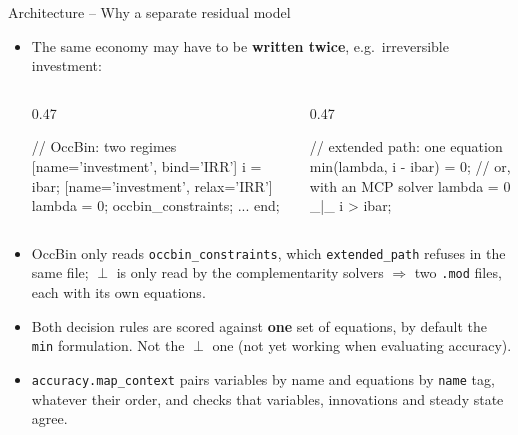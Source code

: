 \documentclass[11pt,aspectratio=169]{beamer}
\newcommand{\code}[1]{\texttt{#1}}
\begin{document}
\begin{frame}[fragile]{Architecture -- Why a separate residual model}

\begin{itemize}

\item The same economy may have to be \textbf{written twice}, e.g.\ irreversible investment:
\begin{columns}[T]
\begin{column}{0.47\textwidth}
\begin{semiverbatim}\scriptsize
// OccBin: two regimes
[name='investment', bind='IRR']
i = ibar;
[name='investment', relax='IRR']
lambda = 0;
occbin_constraints; ... end;
\end{semiverbatim}
\end{column}
\begin{column}{0.47\textwidth}
\begin{semiverbatim}\scriptsize
// extended path: one equation
min(lambda, i - ibar) = 0;
// or, with an MCP solver
lambda = 0 _|_ i > ibar;
\end{semiverbatim}
\end{column}
\end{columns}

\medskip

\item OccBin only reads \code{occbin\_constraints}, which \code{extended\_path} refuses in the same file; $\perp$ is only read by the complementarity solvers $\Rightarrow$ two \code{.mod} files, each with its own equations.\newline

\item Both decision rules are scored against \textbf{one} set of equations, by default the \code{min} formulation. Not the $\perp$ one (not yet working when evaluating accuracy).\newline

\item \code{accuracy.map\_context} pairs variables by name and equations by \code{name} tag, whatever their order, and checks that variables, innovations and steady state agree.

\end{itemize}

\end{frame}
\end{document}
